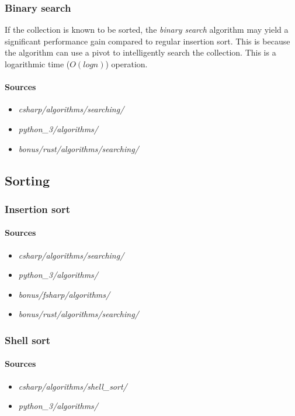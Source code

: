 \documentclass{article}
\begin{document}
\subsubsection{Binary search}
If the collection is known to be sorted, the {\em binary search} algorithm may yield a significant performance
gain compared to regular insertion sort. This is because the algorithm can use a pivot to intelligently search
the collection. This is a logarithmic time (\(O(log n)\)) operation.


\paragraph{Sources}
\begin{itemize}
\item{{\em csharp/algorithms/searching/}}
\item{{\em python\_3/algorithms/}}
\item{{\em bonus/rust/algorithms/searching/}}
\end{itemize}


\iffalse



\newpage

\subsection{Sorting}
\subsubsection{Insertion sort}
\paragraph{Sources}
\begin{itemize}
\item{{\em csharp/algorithms/searching/}}
\item{{\em python\_3/algorithms/}}
\item{{\em bonus/fsharp/algorithms/}}
\item{{\em bonus/rust/algorithms/searching/}}
\end{itemize}


\subsubsection{Shell sort}
\paragraph{Sources}
\begin{itemize}
\item{{\em csharp/algorithms/shell\_sort/}}
\item{{\em python\_3/algorithms/}}
\end{itemize}
\end{document}
